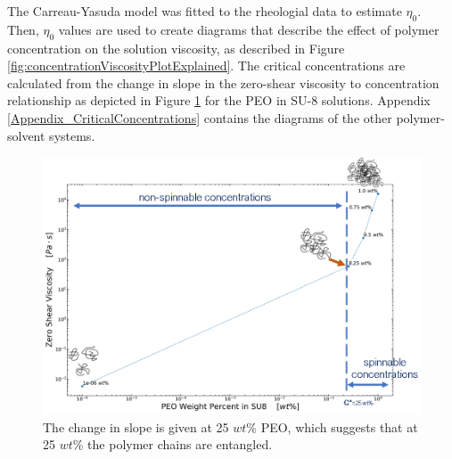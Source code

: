 The Carreau-Yasuda model was fitted to the rheologial data to estimate $\eta_0$. Then, $\eta_0$ values are used to create diagrams that describe the effect of polymer concentration on the solution viscosity, as described in Figure \ref{fig:concentrationViscosityPlotExplained}. The critical concentrations are calculated from the change in slope in the zero-shear viscosity to concentration relationship as depicted in Figure \ref{fig:criticalConcentrationCalculation} for the PEO in SU-8 solutions. Appendix \ref{Appendix_CriticalConcentrations} contains the diagrams of the other polymer-solvent systems. 

\begin{figure}[!th]
\centering
\includegraphics[width=\textwidth]{./Figures/criticalConcentrationCalculation.png}
\decoRule
\caption[Estimation of the Critical Concentration of the PEO in SU-8 solutions]{The change in slope is given at 25 $wt\%$ PEO, which suggests that at 25 $wt\%$ the polymer chains are entangled.}
\label{fig:criticalConcentrationCalculation}
\end{figure}

